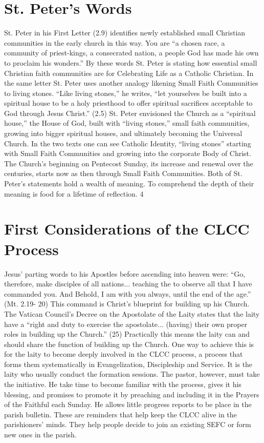 \documentclass{article}        %
\begin{document}
\section{St. Peter's Words}

St. Peter in his First Letter (2.9) identifies newly established small Christian
communities in the early church in this way. You are ``a chosen race, a
community of priest-kings, a consecrated nation, a people God has made his own
to proclaim his wonders.'' By these words St. Peter is stating how essential
small Christian faith communities are for Celebrating Life as a Catholic
Christian.
In the same letter St. Peter uses another analogy likening Small Faith
Communities to living stones. ``Like living stones,'' he writes, ``let
yourselves be built into a spiritual house to be a holy priesthood to offer
spiritual sacrifices acceptable to God through Jesus Christ.'' (2.5) St. Peter
envisioned the Church as a ``spiritual house,'' the House of God, built with
``living stones,'' small faith communities, growing into bigger spiritual
houses, and ultimately becoming the Universal Church. In the two texts one can
see Catholic Identity, ``living stones'' starting with Small Faith Communities
and growing into the corporate Body of Christ. The Church's beginning on
Pentecost Sunday, its increase and renewal over the centuries, starts now as
then through Small Faith Communities. Both of St. Peter's statements hold a
wealth of meaning. To comprehend the depth of their meaning is food for a
lifetime of reflection.
4

\section{First Considerations of the CLCC Process}

Jesus' parting words to his Apostles before ascending into heaven were: ``Go,
therefore, make disciples of all nations... teaching the to observe all that I
have commanded you. And Behold, I am with you always, until the end of the
age.'' (Mt. 2.19- 20) This command is Christ's blueprint for building up his
Church. The Vatican Council's Decree on the Apostolate of the Laity states that
the laity have a ``right and duty to exercise the apostolate... (having) their
own proper roles in building up the Church.'' (25) Practically this means the
laity can and should share the function of building up the Church. One way to
achieve this is for the laity to become deeply involved in the CLCC process, a
process that forms them systematically in Evangelization, Discipleship and
Service.
It is the laity who usually conduct the formation sessions. The pastor, however,
must take the initiative. He take time to become familiar with the process,
gives it his blessing, and promises to promote it by preaching and including it
in the Prayers of the Faithful each Sunday. He allows little progress reports to
be place in the parish bulletin. These are reminders that help keep the CLCC
alive in the parishioners' minds. They help people decide to join an existing
SEFC or form new ones in the parish.
\end{document}
